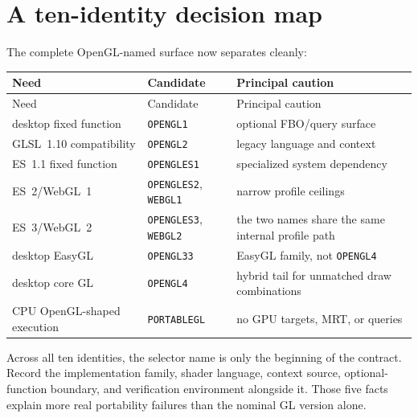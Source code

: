 \section{A ten-identity decision map}

The complete OpenGL-named surface now separates cleanly:

\begin{longtable}{p{}p{}p{}}
\toprule
Need & Candidate & Principal caution \\
\midrule
\endfirsthead
\toprule
Need & Candidate & Principal caution \\
\midrule
\endhead
desktop fixed function & \texttt{OPENGL1} & optional FBO/query surface \\
GLSL~1.10 compatibility & \texttt{OPENGL2} & legacy language and context \\
ES~1.1 fixed function & \texttt{OPENGLES1} & specialized system dependency \\
ES~2/WebGL~1 & \texttt{OPENGLES2}, \texttt{WEBGL1} & narrow profile ceilings \\
ES~3/WebGL~2 & \texttt{OPENGLES3}, \texttt{WEBGL2} & the two names share the same internal profile path \\
desktop EasyGL & \texttt{OPENGL33} & EasyGL family, not \texttt{OPENGL4} \\
desktop core GL & \texttt{OPENGL4} & hybrid tail for unmatched draw combinations \\
CPU OpenGL-shaped execution & \texttt{PORTABLEGL} & no GPU targets, MRT, or queries \\
\bottomrule
\end{longtable}

Across all ten identities, the selector name is only the beginning of the contract.  Record
the implementation family, shader language, context source, optional-function boundary, and
verification environment alongside it.  Those five facts explain more real portability
failures than the nominal GL version alone.
